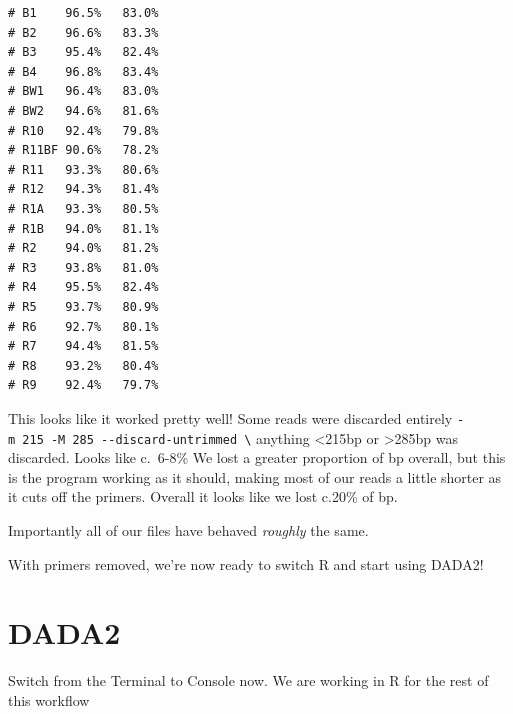 \documentclass[
]{book}
\makeatletter
\newenvironment{kframe}{%
\medskip{}
\setlength{\fboxsep}{.8em}
 \def\at@end@of@kframe{}%
 \ifinner\ifhmode%
  \def\at@end@of@kframe{\end{minipage}}%
  \begin{minipage}{\columnwidth}%
 \fi\fi%
 \def\FrameCommand##1{\hskip\@totalleftmargin \hskip-\fboxsep
 \colorbox{shadecolor}{##1}\hskip-\fboxsep
     \hskip-\linewidth \hskip-\@totalleftmargin \hskip\columnwidth}%
 \MakeFramed {\advance\hsize-\width
   \@totalleftmargin\z@ \linewidth\hsize
   \@setminipage}}%
 {\par\unskip\endMakeFramed%
 \at@end@of@kframe}
\newenvironment{block}[1]
  {
  \begin{itemize}
  \renewcommand{\labelitemi}{
    \raisebox{-.7\height}[0pt][0pt]{
      {\setkeys{Gin}{width=3em,keepaspectratio}\texttt{[image: images/\#1]}}
    }
  }
  \setlength{\fboxsep}{1em}
  \begin{kframe}
  \item
  }
  {
  \end{kframe}
  \end{itemize}
  }
\newenvironment{rmdwarning}
  {\begin{block}{warning}}
  {\end{block}}
\makeatother
\begin{document}
\begin{verbatim}
# B1    96.5%   83.0%
# B2    96.6%   83.3%
# B3    95.4%   82.4%
# B4    96.8%   83.4%
# BW1   96.4%   83.0%
# BW2   94.6%   81.6%
# R10   92.4%   79.8%
# R11BF 90.6%   78.2%
# R11   93.3%   80.6%
# R12   94.3%   81.4%
# R1A   93.3%   80.5%
# R1B   94.0%   81.1%
# R2    94.0%   81.2%
# R3    93.8%   81.0%
# R4    95.5%   82.4%
# R5    93.7%   80.9%
# R6    92.7%   80.1%
# R7    94.4%   81.5%
# R8    93.2%   80.4%
# R9    92.4%   79.7%
\end{verbatim}

This looks like it worked pretty well!
Some reads were discarded entirely \texttt{-m\ 215\ -M\ 285\ -\/-discard-untrimmed\ \textbackslash{}} anything \textless215bp or \textgreater285bp was discarded. Looks like c.~6-8\%
We lost a greater proportion of bp overall, but this is the program working as it should, making most of our reads a little shorter as it cuts off the primers. Overall it looks like we lost c.20\% of bp.

Importantly all of our files have behaved \emph{roughly} the same.

With primers removed, we're now ready to switch R and start using DADA2!

\hypertarget{dada2}{%
\section{DADA2}\label{dada2}}

\begin{rmdwarning}
Switch from the Terminal to Console now. We are working in R for the
rest of this workflow
\end{rmdwarning}
\end{document}
